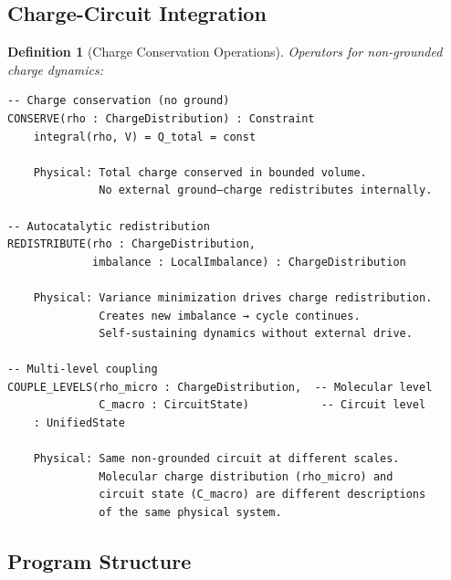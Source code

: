 \documentclass[aps,prd,twocolumn,superscriptaddress,floatfix,nofootinbib]{revtex4-2}
\newtheorem{definition}[theorem]{Definition}
\theoremstyle{remark}
\begin{document}
\subsection{Charge-Circuit Integration}

\begin{definition}[Charge Conservation Operations]
\label{def:charge_ops}
Operators for non-grounded charge dynamics:
\begin{verbatim}
-- Charge conservation (no ground)
CONSERVE(rho : ChargeDistribution) : Constraint
    integral(rho, V) = Q_total = const
    
    Physical: Total charge conserved in bounded volume.
              No external ground—charge redistributes internally.

-- Autocatalytic redistribution
REDISTRIBUTE(rho : ChargeDistribution,
             imbalance : LocalImbalance) : ChargeDistribution
    
    Physical: Variance minimization drives charge redistribution.
              Creates new imbalance → cycle continues.
              Self-sustaining dynamics without external drive.

-- Multi-level coupling
COUPLE_LEVELS(rho_micro : ChargeDistribution,  -- Molecular level
              C_macro : CircuitState)           -- Circuit level
    : UnifiedState
    
    Physical: Same non-grounded circuit at different scales.
              Molecular charge distribution (rho_micro) and
              circuit state (C_macro) are different descriptions
              of the same physical system.
\end{verbatim}
\end{definition}

\subsection{Program Structure}
\end{document}
